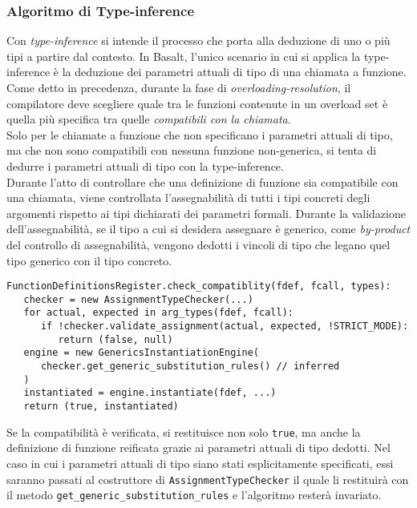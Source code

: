 \subsubsection{Algoritmo di Type-inference}
Con \textit{type-inference} si intende il processo che porta alla deduzione di uno o più 
tipi a partire dal contesto. In Basalt, l'unico scenario in cui si applica la type-inference è
la deduzione dei parametri attuali di tipo di una chiamata a funzione. \\

Come detto in precedenza, durante la fase di \textit{overloading-resolution}, il 
compilatore deve scegliere quale tra le funzioni contenute in un overload set è 
quella più specifica tra quelle \textit{compatibili con la chiamata}. \\

Solo per le chiamate a funzione che non specificano i parametri attuali di tipo, ma che non 
sono compatibili con nessuna funzione non-generica, si tenta di dedurre i parametri attuali
di tipo con la type-inference. \\

Durante l'atto di controllare che una definizione di funzione sia compatibile con una chiamata,
viene controllata l'assegnabilità di tutti i tipi concreti degli argomenti rispetto ai tipi 
dichiarati dei parametri formali. Durante la validazione dell'assegnabilità, se il tipo a cui si desidera
assegnare è generico, come \textit{by-product} del controllo di assegnabilità, vengono dedotti i vincoli di tipo
che legano quel tipo generico con il tipo concreto. \\

\vspace{0.5cm}
\begin{lstlisting}[frame=single]
FunctionDefinitionsRegister.check_compatiblity(fdef, fcall, types):
   checker = new AssignmentTypeChecker(...)
   for actual, expected in arg_types(fdef, fcall):
      if !checker.validate_assignment(actual, expected, !STRICT_MODE):
         return (false, null)
   engine = new GenericsInstantiationEngine(
      checker.get_generic_substitution_rules() // inferred
   )
   instantiated = engine.instantiate(fdef, ...)
   return (true, instantiated)
\end{lstlisting}
\vspace{0.5cm}

Se la compatibilità è verificata, si restituisce non solo \texttt{true}, ma anche la definizione 
di funzione reificata grazie ai parametri attuali di tipo dedotti. Nel caso in cui i parametri attuali di 
tipo siano stati esplicitamente specificati, essi saranno passati al costruttore di \texttt{AssignmentTypeChecker}
il quale li restituirà con il metodo \texttt{get\_generic\_substitution\_rules} e l'algoritmo resterà invariato. \\

